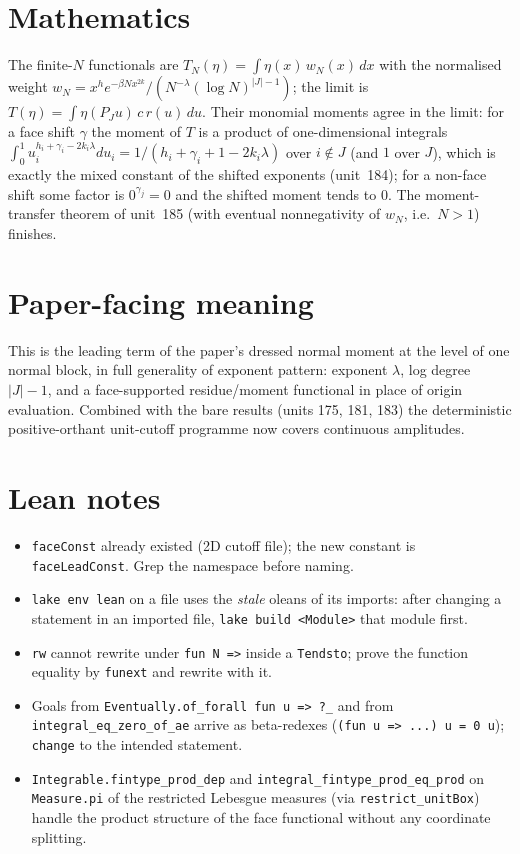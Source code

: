 \documentclass[11pt]{article}
\begin{document}
\section{Mathematics}
The finite-$N$ functionals are $T_N(\eta)=\int\eta(x)\,w_N(x)\,dx$ with the normalised weight
$w_N=x^he^{-\beta Nx^{2k}}/(N^{-\lambda}(\log N)^{|J|-1})$; the limit is
$T(\eta)=\int\eta(P_Ju)\,c\,r(u)\,du$. Their monomial moments agree in the limit: for a face shift
$\gamma$ the moment of $T$ is a product of one-dimensional integrals
$\int_0^1u_i^{h_i+\gamma_i-2k_i\lambda}du_i=1/(h_i+\gamma_i+1-2k_i\lambda)$ over $i\notin J$ (and $1$
over $J$), which is exactly the mixed constant of the shifted exponents (unit~184); for a non-face
shift some factor is $0^{\gamma_j}=0$ and the shifted moment tends to $0$. The moment-transfer
theorem of unit~185 (with eventual nonnegativity of $w_N$, i.e.\ $N>1$) finishes.

\section{Paper-facing meaning}
This is the leading term of the paper's dressed normal moment at the level of one normal block, in
full generality of exponent pattern: exponent $\lambda$, log degree $|J|-1$, and a face-supported
residue/moment functional in place of origin evaluation. Combined with the bare results
(units 175, 181, 183) the deterministic positive-orthant unit-cutoff programme now covers continuous
amplitudes.

\section{Lean notes}
\begin{itemize}
\item \texttt{faceConst} already existed (2D cutoff file); the new constant is \texttt{faceLeadConst}.
Grep the namespace before naming.
\item \texttt{lake env lean} on a file uses the \emph{stale} oleans of its imports: after changing a
statement in an imported file, \texttt{lake build <Module>} that module first.
\item \texttt{rw} cannot rewrite under \texttt{fun N =>} inside a \texttt{Tendsto}; prove the
function equality by \texttt{funext} and rewrite with it.
\item Goals from \texttt{Eventually.of\_forall fun u => ?\_} and from \texttt{integral\_eq\_zero\_of\_ae}
arrive as beta-redexes (\texttt{(fun u => ...) u = 0 u}); \texttt{change} to the intended statement.
\item \texttt{Integrable.fintype\_prod\_dep} and \texttt{integral\_fintype\_prod\_eq\_prod} on
\texttt{Measure.pi} of the restricted Lebesgue measures (via \texttt{restrict\_unitBox}) handle the
product structure of the face functional without any coordinate splitting.
\end{itemize}
\end{document}
